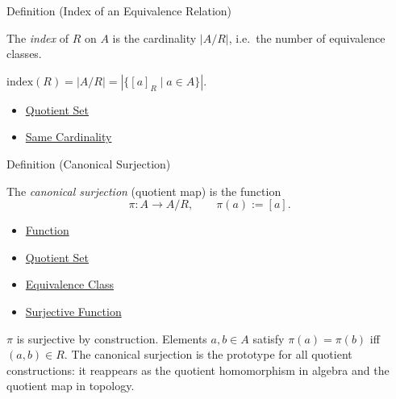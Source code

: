 \begin{definitionbox}{Definition (Index of an Equivalence Relation)}
\begin{definition}\label{def:index}
The \emph{index} of $R$ on $A$ is the cardinality $|A/R|$, i.e.\ the number
of equivalence classes.
\end{definition}
\end{definitionbox}

\begin{remark*}
$\mathrm{index}(R) = |A/R| = |\{[a]_R \mid a \in A\}|$.
\end{remark*}

\begin{dependencies}
\begin{itemize}
  \item \hyperref[def:quotient-set]{Quotient Set}
  \item \hyperref[def:same-cardinality]{Same Cardinality}
\end{itemize}
\end{dependencies}

\begin{definitionbox}{Definition (Canonical Surjection)}
\begin{definition}\label{def:canonical-surj}
The \emph{canonical surjection} (quotient map) is the function
\[
\pi : A \to A/R,
\qquad
\pi(a) := [a].
\]
\end{definition}
\end{definitionbox}

\begin{dependencies}
\begin{itemize}
  \item \hyperref[def:function]{Function}
  \item \hyperref[def:quotient-set]{Quotient Set}
  \item \hyperref[def:equiv-class]{Equivalence Class}
  \item \hyperref[def:surjective]{Surjective Function}
\end{itemize}
\end{dependencies}

\begin{remark*}[Properties of $\pi$]
$\pi$ is surjective by construction. Elements $a, b \in A$ satisfy
$\pi(a) = \pi(b)$ iff $(a,b) \in R$. The canonical surjection is the
prototype for all quotient constructions: it reappears as the quotient
homomorphism in algebra and the quotient map in topology.
\end{remark*}

